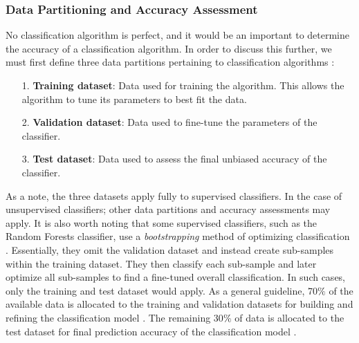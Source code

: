 \subsubsection{Data Partitioning and Accuracy Assessment}

\justify
No classification algorithm is perfect, and it would be an important to determine the accuracy of a classification algorithm. In order to discuss this further, we must first define three data partitions pertaining to classification algorithms \citep{AI2009}:

\begin{itemize}
	\item[1. ] \textbf{Training dataset}: Data used for training the algorithm. This allows the algorithm to tune its parameters to best fit the data. 
	\item[2. ] \textbf{Validation dataset}: Data used to fine-tune the parameters of the classifier.
	\item[3. ] \textbf{Test dataset}: Data used to assess the final unbiased accuracy of the classifier. 
\end{itemize}

\justify
As a note, the three datasets apply fully to supervised classifiers. In the case of unsupervised classifiers; other data partitions and accuracy assessments may apply. It is also worth noting that some supervised classifiers, such as the Random Forests classifier, use a \textit{bootstrapping} method of optimizing classification \citep{AI2009}. Essentially, they omit the validation dataset and instead create sub-samples within the training dataset. They then classify each sub-sample and later optimize all sub-samples to find a fine-tuned overall classification. In such cases, only the training and test dataset would apply. As a general guideline, 70$\%$ of the available data is allocated to the training and validation datasets for building and refining the classification model \citep{mucherino2009}. The remaining 30$\%$ of data is allocated to the test dataset for final prediction accuracy of the classification model \citep{mucherino2009}.

